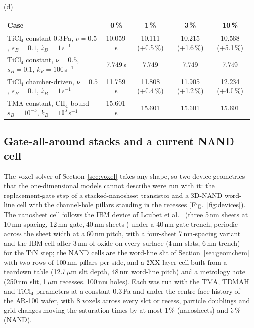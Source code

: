 \documentclass[11pt,letterpaper]{article}
\begin{document}
\begin{table}[tbp]
\begin{tabular}{P{0.75in}lcP{0.55in}P{0.45in}P{0.7in}P{0.65in}P{0.6in}P{0.45in}}
\bottomrule
\end{tabular}
\par\medskip (d)\par\smallskip
\begin{tabular}{P{2.4in}cccc}
\toprule
Case & 0\,\% & 1\,\% & 3\,\% & 10\,\% \\
\midrule
TiCl$_4$ constant 0.3\,Pa, $\nu = 0.5$, $s_B = 0.1$, $k_B = 1$\,s$^{-1}$ & 10.059\,s & 10.111 (+0.5\,\%) & 10.215 (+1.6\,\%) & 10.568 (+5.1\,\%) \\
TiCl$_4$ constant, $\nu = 0.5$, $s_B = 0.1$, $k_B = 100$\,s$^{-1}$ & 7.749\,s & 7.749 & 7.749 & 7.749 \\
TiCl$_4$ chamber-driven, $\nu = 0.5$, $s_B = 0.1$, $k_B = 1$\,s$^{-1}$ & 11.759\,s & 11.808 (+0.4\,\%) & 11.905 (+1.2\,\%) & 12.234 (+4.0\,\%) \\
TMA constant, CH$_4$ bound $s_B = 10^{-3}$, $k_B = 10^{3}$\,s$^{-1}$ & 15.601\,s & 15.601 & 15.601 & 15.601 \\
\bottomrule
\end{tabular}
\end{table}

\subsection{Gate-all-around stacks and a current NAND cell}
\label{sec:devices}
The voxel solver of Section~\ref{sec:voxel} takes any shape, so two device geometries that the one-dimensional models cannot describe were run with it: the replacement-gate step of a stacked-nanosheet transistor and a 3D-NAND word-line cell with the channel-hole pillars standing in the recesses (Fig.~\ref{fig:devices}). The nanosheet cell follows the IBM device of Loubet et al.\ \cite{loubet2017} (three 5\,nm sheets at 10\,nm spacing, 12\,nm gate, 40\,nm sheets \cite{semieng2018}) under a 40\,nm gate trench, periodic across the sheet width at a 60\,nm pitch, with a four-sheet 7\,nm-spacing variant \cite{wong2022} and the IBM cell after 3\,nm of oxide on every surface (4\,nm slots, 6\,nm trench) for the TiN step; the NAND cells are the word-line slit of Section~\ref{sec:geomchem} with two rows of 100\,nm pillars per side, and a 2XX-layer cell built from a teardown table \cite{techinsights2023} (12.7\,$\mu$m slit depth, 48\,nm word-line pitch) and a metrology note \cite{onto2023} (250\,nm slit, 1\,$\mu$m recesses, 100\,nm holes). Each was run with the TMA, TDMAH and TiCl$_4$ parameters at a constant 0.3\,Pa and under the centre-face history of the AR-100 wafer, with 8 voxels across every slot or recess, particle doublings and grid changes moving the saturation times by at most 1\,\% (nanosheets) and 3\,\% (NAND).
\end{document}
